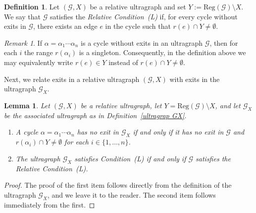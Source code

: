 \documentclass[12pt, reqno]{amsart}
\newtheorem{lemma}[theorem]{Lemma}
\theoremstyle{definition}
\newtheorem{definition}[theorem]{Definition}
\theoremstyle{remark}
\newtheorem{remark}[theorem]{Remark}
\numberwithin{equation}{section}
\begin{document}
\begin{definition}
Let $(\mathcal{G}, X)$ be a relative ultragraph and set $Y := \mathrm{Reg}(\mathcal{G}) \setminus X$.
We say that $\mathcal{G}$ satisfies the \emph{Relative Condition~(L)} if, for every cycle without
exits in $\mathcal{G}$, there exists an edge $e$ in the cycle such that
$r(e)\cap Y \neq \emptyset$.
\end{definition}

\begin{remark}
If $\alpha=\alpha_1\cdots \alpha_n$ is a cycle without exits in an ultragraph $\mathcal{G}$,
then for each $i$ the range $r(\alpha_i)$ is a singleton. Consequently, in the definition above
we may equivalently write $r(e)\in Y$ instead of $r(e)\cap Y\neq \emptyset$.
\end{remark}

Next, we relate exits in a relative ultragraph $(\mathcal{G},X)$ with exits in the ultragraph
$\mathcal{G}_X$.

\begin{lemma}\label{lemma relative condition L}
Let $(\mathcal{G}, X)$ be a relative ultragraph, let $Y=\mathrm{Reg}(\mathcal{G})\setminus X$,
and let $\mathcal{G}_X$ be the associated ultragraph as in Definition~\ref{ultragrap GX}.
\begin{enumerate}
    \item A cycle $\alpha=\alpha_1\cdots \alpha_n$ has no exit in $\mathcal{G}_X$ if and only if
    it has no exit in $\mathcal{G}$ and $r(\alpha_i)\cap Y\neq \emptyset$ for each
    $i\in\{1,\dots,n\}$.
    \item The ultragraph $\mathcal{G}_X$ satisfies Condition~(L) if and only if $\mathcal{G}$
    satisfies the Relative Condition~(L).
\end{enumerate}
\end{lemma}

\begin{proof}
The proof of the first item follows directly from the definition of the ultragraph $\mathcal{G}_X$,
and we leave it to the reader. The second item follows immediately from the first.
\end{proof}


\end{document}
